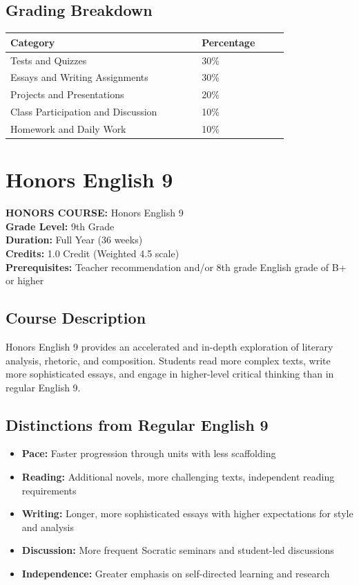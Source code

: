 \documentclass[12pt,oneside]{book}
\begin{document}
\section{Grading Breakdown}
\begin{center}
\begin{tabular}{L{0.55\linewidth}L{0.25\linewidth}}
\toprule
\textbf{Category} & \textbf{Percentage} \\
\midrule
Tests and Quizzes & 30\% \\
Essays and Writing Assignments & 30\% \\
Projects and Presentations & 20\% \\
Class Participation and Discussion & 10\% \\
Homework and Daily Work & 10\% \\
\bottomrule
\end{tabular}
\end{center}

\chapter{Honors English 9}

\noindent\textbf{HONORS COURSE:} Honors English 9\\
\textbf{Grade Level:} 9th Grade\\
\textbf{Duration:} Full Year (36 weeks)\\
\textbf{Credits:} 1.0 Credit (Weighted 4.5 scale)\\
\textbf{Prerequisites:} Teacher recommendation and/or 8th grade English grade of B+ or higher

\section{Course Description}
Honors English 9 provides an accelerated and in-depth exploration of literary analysis, rhetoric,
and composition. Students read more complex texts, write more sophisticated essays, and engage
in higher-level critical thinking than in regular English 9.

\section{Distinctions from Regular English 9}
\begin{itemize}[leftmargin=2em]
    \item \textbf{Pace:} Faster progression through units with less scaffolding
    \item \textbf{Reading:} Additional novels, more challenging texts, independent reading requirements
    \item \textbf{Writing:} Longer, more sophisticated essays with higher expectations for style and analysis
    \item \textbf{Discussion:} More frequent Socratic seminars and student-led discussions
    \item \textbf{Independence:} Greater emphasis on self-directed learning and research
\end{itemize}
\end{document}
